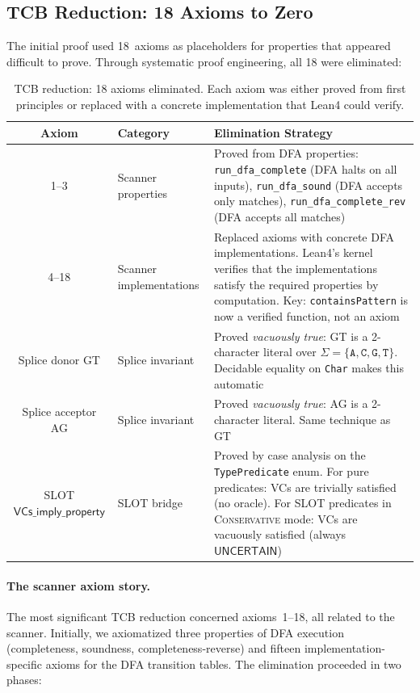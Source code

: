 \documentclass[acmsmall,review,anonymous]{acmart}
\newcommand{\UNCERTAIN}{\ensuremath{\mathsf{UNCERTAIN}}\xspace}
\newcommand{\CONSERVATIVE}{\textsc{Conservative}\xspace}
\begin{document}
\subsection{TCB Reduction: 18 Axioms to Zero}\label{sec:tcb-reduction}

The initial proof used 18~axioms as placeholders for properties that
appeared difficult to prove.
Through systematic proof engineering, all 18 were eliminated:

\begin{table}[t]
\centering
\caption{TCB reduction: 18 axioms eliminated. Each axiom was either
         proved from first principles or replaced with a concrete
         implementation that Lean4 could verify.}
\label{tab:axiom-elim}
\begin{tabular}{clp{5.5cm}}
\toprule
\textbf{Axiom} & \textbf{Category} & \textbf{Elimination Strategy} \\
\midrule
1--3 & Scanner properties &
  Proved from DFA properties: \texttt{run\_dfa\_complete}
  (DFA halts on all inputs), \texttt{run\_dfa\_sound}
  (DFA accepts only matches), \texttt{run\_dfa\_complete\_rev}
  (DFA accepts all matches) \\
\midrule
4--18 & Scanner implementations &
  Replaced axioms with concrete DFA implementations.
  Lean4's kernel verifies that the implementations satisfy the
  required properties by computation.
  Key: \texttt{containsPattern} is now a verified function, not
  an axiom \\
\midrule
Splice donor GT & Splice invariant &
  Proved \emph{vacuously true}: GT is a 2-character literal over
  $\Sigma = \{\texttt{A},\texttt{C},\texttt{G},\texttt{T}\}$.
  Decidable equality on \texttt{Char} makes this automatic \\
\midrule
Splice acceptor AG & Splice invariant &
  Proved \emph{vacuously true}: AG is a 2-character literal.
  Same technique as GT \\
\midrule
SLOT $\textsf{VCs\_imply\_property}$ & SLOT bridge &
  Proved by case analysis on the \texttt{TypePredicate} enum.
  For pure predicates: VCs are trivially satisfied (no oracle).
  For SLOT predicates in \CONSERVATIVE{} mode: VCs are vacuously
  satisfied (always \UNCERTAIN) \\
\bottomrule
\end{tabular}
\end{table}

\paragraph{The scanner axiom story.}
The most significant TCB reduction concerned axioms~1--18, all related
to the scanner.
Initially, we axiomatized three properties of DFA execution
(completeness, soundness, completeness-reverse) and fifteen
implementation-specific axioms for the DFA transition tables.
The elimination proceeded in two phases:
\end{document}
